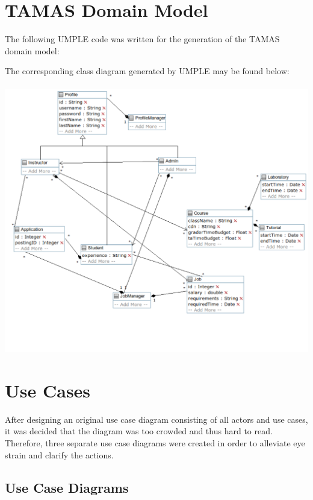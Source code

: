 \documentclass[12pt]{report}
\begin{document}
\chapter{TAMAS Domain Model}
The following UMPLE code was written for the generation of the TAMAS domain model:

The corresponding class diagram generated by UMPLE may be found below:\\\\
\includegraphics[scale=0.6]{model/Diagrams/classdiagram}

\chapter{Use Cases}
After designing an original use case diagram consisting of all actors and use cases, it was decided
that the diagram was too crowded and thus hard to read. Therefore, three separate use case diagrams
were created in order to alleviate eye strain and clarify the actions.
\section{Use Case Diagrams}
\end{document}
